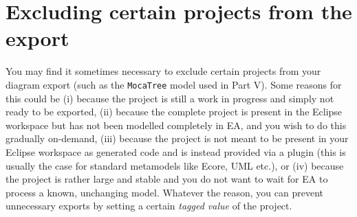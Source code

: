 \newpage
\section{Excluding certain projects from the export}

You may find it sometimes necessary to exclude certain projects from your diagram export (such as the \texttt{MocaTree} model used in Part V).
Some reasons for this could be (i) because the project is still a work in progress and simply not ready to be exported, (ii) because the
complete project is present in the Eclipse workspace but has not been modelled completely in EA, and you wish to do this gradually on-demand, (iii) because the
project is not meant to be present in your Eclipse workspace as generated code and is instead provided via a plugin (this is usually the case for standard
metamodels like Ecore, UML etc.), or (iv) because the project is rather large and stable and you do not want to wait for EA to process a known, unchanging
model. Whatever the reason, you can prevent unnecessary exports by setting a certain \emph{tagged value} of the project.

